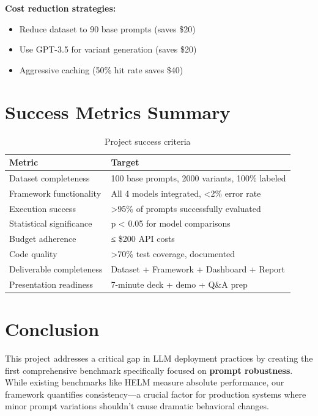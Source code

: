 \documentclass[11pt,a4paper]{article}
\begin{document}
\textbf{Cost reduction strategies:}
\begin{itemize}
    \item Reduce dataset to 90 base prompts (saves \$20)
    \item Use GPT-3.5 for variant generation (saves \$20)
    \item Aggressive caching (50\% hit rate saves \$40)
\end{itemize}

\section{Success Metrics Summary}

\begin{table}[h]
\centering
\begin{tabular}{@{}lp{8cm}@{}}
\toprule
\textbf{Metric} & \textbf{Target} \\ \midrule
Dataset completeness & 100 base prompts, 2000 variants, 100\% labeled \\
Framework functionality & All 4 models integrated, <2\% error rate \\
Execution success & >95\% of prompts successfully evaluated \\
Statistical significance & p < 0.05 for model comparisons \\
Budget adherence & ≤ \$200 API costs \\
Code quality & >70\% test coverage, documented \\
Deliverable completeness & Dataset + Framework + Dashboard + Report \\
Presentation readiness & 7-minute deck + demo + Q\&A prep \\ \bottomrule
\end{tabular}
\caption{Project success criteria}
\end{table}

\newpage

\section{Conclusion}

This project addresses a critical gap in LLM deployment practices by creating the first comprehensive benchmark specifically focused on \textbf{prompt robustness}. While existing benchmarks like HELM measure absolute performance, our framework quantifies consistency—a crucial factor for production systems where minor prompt variations shouldn't cause dramatic behavioral changes.
\end{document}
